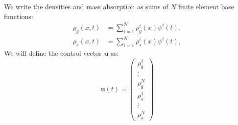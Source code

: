 We write the densities and mass absorption as sums of $N$ finite element base functions:
\begin{equation*}
\begin{aligned}
\rho_g(x, t)&=\sum_{i=1}^{N}{\rho_g^{i}(x)\psi^i(t)},\\
\rho_s(x, t)&=\sum_{i=1}^{N}{\rho_s^{i}(x)\psi^i(t)},
\end{aligned}
\end{equation*}
We will define the control vector $\mathbf{u}$ as:
\begin{equation}
    \mathbf{u}(t) = \begin{pmatrix}
        \rho_g^1 \\ 
        \vdots \\
        \rho_g^N \\
        \rho_s^1 \\
        \vdots \\
        \rho_s^N
    \end{pmatrix}
\end{equation}

